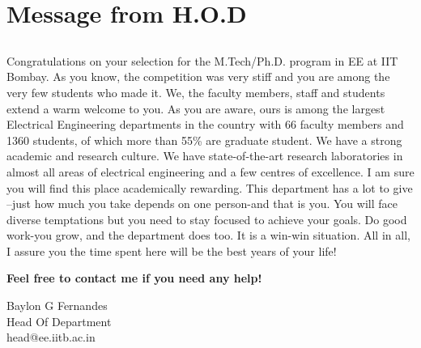 \documentclass[openany]{book} %
\begin{document}
\chapter{Message from H.O.D}

\section*{}
Congratulations on your selection for the M.Tech/Ph.D. program in EE at
IIT Bombay. As you know, the competition was very stiff and you are among
the very few students who made it. We, the faculty members, staff and
students extend a warm welcome to you.
\medskip
\newline
As you are aware, ours is among the largest Electrical Engineering
departments in the country with 66 faculty members and 1360 students, of
which more than 55\% are graduate student. We have a strong academic and
research culture. We have state-of-the-art research laboratories in almost
all areas of electrical engineering and a few centres of excellence. I am
sure you will find this place academically rewarding.
\medskip
\newline
This department has a lot to give –just how much you take depends on one
person-and that is you. You will face diverse temptations but you need to
stay focused to achieve your goals. Do good work-you grow, and the
department does too. It is a win-win situation. All in all, I assure you
the time spent here will be the best years
of your life!
\newline
\begin{center}
    \textbf{Feel free to contact me if you need any help!}\\

\begin{flushright}
	{\LARGE\fmmfamily
	Baylon G Fernandes\\}
	Head Of Department\\
	head@ee.iitb.ac.in\\
\end{flushright}
\end{center}
\end{document}
